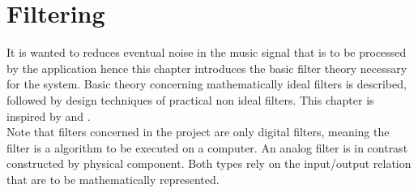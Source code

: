 \chapter{Filtering} \label{ch8}
It is wanted to reduces eventual noise in the music signal that is to be processed by the application hence this chapter introduces the basic filter theory necessary for the system. Basic theory concerning mathematically ideal filters is described, followed by design techniques of practical non ideal filters. This chapter is inspired by \cite{DTSP, ch. 5,7} and \cite{FSP, sec. 3.4.4}. \\
Note that filters concerned in the project are only digital filters, meaning the filter is a algorithm to be executed on a computer. An analog filter is in contrast constructed by physical component. Both types rely on the input/output relation that are to be mathematically represented.



